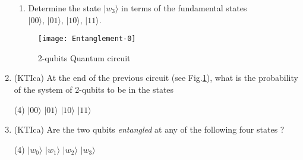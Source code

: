 \documentclass{article}
\begin{document}
\begin{enumerate}
\begin{enumerate}
	\item Determine the state $|w_3\rangle$ in terms of the fundamental states $|00\rangle,\,|01\rangle,\,|10\rangle,\,|11\rangle$. 
	\end{enumerate}
\begin{figure}[h]
\centering
\texttt{[image: Entanglement-0]}
\caption{2-qubits Quantum circuit}
\label{Entanglement-0}
\end{figure}
\item (KTIca) At the end of the previous circuit (see Fig.\ref{Entanglement-0}), what is the probability of the system of 2-qubits to be in the states
	\begin{tasks}(4) \task $|00\rangle$ \task $|01\rangle$ \task $|10\rangle$ \task $|11\rangle$  \end{tasks}

\item (KTIca) Are the two qubits \textit{entangled} at any of the following four states ?
	\begin{tasks}(4) \task $|w_0\rangle$ \task $|w_1\rangle$ \task $|w_2\rangle$ \task $|w_3\rangle$  \end{tasks}
\end{enumerate}
\end{document}
